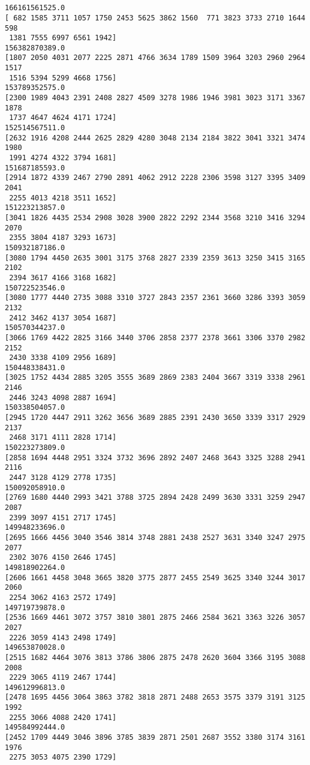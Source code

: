\documentclass{article}
\begin{document}
    \begin{center}
    \end{center}
    { \hspace*{\fill} \\}
    
    \begin{center}
    \end{center}
    { \hspace*{\fill} \\}
    
    \begin{Verbatim}[commandchars=\\\{\}]
166161561525.0
[ 682 1585 3711 1057 1750 2453 5625 3862 1560  771 3823 3733 2710 1644  598
 1381 7555 6997 6561 1942]
156382870389.0
[1807 2050 4031 2077 2225 2871 4766 3634 1789 1509 3964 3203 2960 2964 1517
 1516 5394 5299 4668 1756]
153789352575.0
[2300 1989 4043 2391 2408 2827 4509 3278 1986 1946 3981 3023 3171 3367 1878
 1737 4647 4624 4171 1724]
152514567511.0
[2632 1916 4208 2444 2625 2829 4280 3048 2134 2184 3822 3041 3321 3474 1980
 1991 4274 4322 3794 1681]
151687185593.0
[2914 1872 4339 2467 2790 2891 4062 2912 2228 2306 3598 3127 3395 3409 2041
 2255 4013 4218 3511 1652]
151223213857.0
[3041 1826 4435 2534 2908 3028 3900 2822 2292 2344 3568 3210 3416 3294 2070
 2355 3804 4187 3293 1673]
150932187186.0
[3080 1794 4450 2635 3001 3175 3768 2827 2339 2359 3613 3250 3415 3165 2102
 2394 3617 4166 3168 1682]
150722523546.0
[3080 1777 4440 2735 3088 3310 3727 2843 2357 2361 3660 3286 3393 3059 2132
 2412 3462 4137 3054 1687]
150570344237.0
[3066 1769 4422 2825 3166 3440 3706 2858 2377 2378 3661 3306 3370 2982 2152
 2430 3338 4109 2956 1689]
150448338431.0
[3025 1752 4434 2885 3205 3555 3689 2869 2383 2404 3667 3319 3338 2961 2146
 2446 3243 4098 2887 1694]
150338504057.0
[2945 1720 4447 2911 3262 3656 3689 2885 2391 2430 3650 3339 3317 2929 2137
 2468 3171 4111 2828 1714]
150223273809.0
[2858 1694 4448 2951 3324 3732 3696 2892 2407 2468 3643 3325 3288 2941 2116
 2447 3128 4129 2778 1735]
150092058910.0
[2769 1680 4440 2993 3421 3788 3725 2894 2428 2499 3630 3331 3259 2947 2087
 2399 3097 4151 2717 1745]
149948233696.0
[2695 1666 4456 3040 3546 3814 3748 2881 2438 2527 3631 3340 3247 2975 2077
 2302 3076 4150 2646 1745]
149818902264.0
[2606 1661 4458 3048 3665 3820 3775 2877 2455 2549 3625 3340 3244 3017 2060
 2254 3062 4163 2572 1749]
149719739878.0
[2536 1669 4461 3072 3757 3810 3801 2875 2466 2584 3621 3363 3226 3057 2027
 2226 3059 4143 2498 1749]
149653870028.0
[2515 1682 4464 3076 3813 3786 3806 2875 2478 2620 3604 3366 3195 3088 2008
 2229 3065 4119 2467 1744]
149612996813.0
[2478 1695 4456 3064 3863 3782 3818 2871 2488 2653 3575 3379 3191 3125 1992
 2255 3066 4088 2420 1741]
149584992444.0
[2452 1709 4449 3046 3896 3785 3839 2871 2501 2687 3552 3380 3174 3161 1976
 2275 3053 4075 2390 1729]
    \end{Verbatim}
\end{document}
